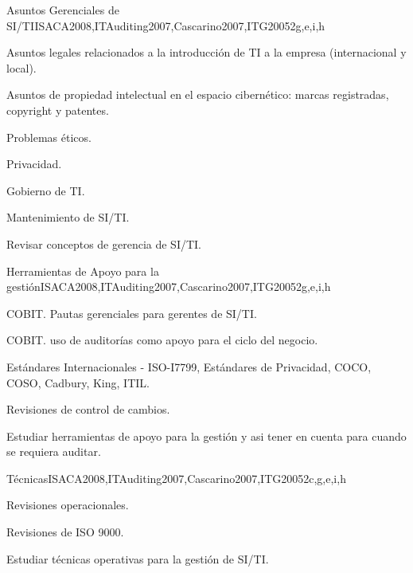 \begin{syllabus}
	\begin{unit}{Asuntos Gerenciales de SI/TI}{}{ISACA2008,ITAuditing2007,Cascarino2007,ITG2005}{2}{g,e,i,h}
	\begin{topics}
	\item Asuntos legales relacionados a la introducción de TI a la empresa (internacional y local).
	\item Asuntos de propiedad intelectual en el espacio cibernético: marcas registradas, copyright y patentes.
	\item Problemas éticos.
	\item Privacidad.
	\item Gobierno de TI.
	\item Mantenimiento de SI/TI.
	\end{topics}
	
	\begin{learningoutcomes}
	\item Revisar conceptos de gerencia de SI/TI.
	\end{learningoutcomes}
	\end{unit}
	
	\begin{unit}{Herramientas de Apoyo para la gestión}{}{ISACA2008,ITAuditing2007,Cascarino2007,ITG2005}{2}{g,e,i,h}
	\begin{topics}
	\item COBIT. Pautas gerenciales para gerentes de SI/TI.
	\item COBIT. uso de auditorías como apoyo para el ciclo del negocio.
	\item Estándares Internacionales - ISO-I7799, Estándares de Privacidad, COCO, COSO, Cadbury, King, ITIL.
	\item Revisiones de control de cambios.
	\end{topics}
	
	\begin{learningoutcomes}
	\item Estudiar herramientas de apoyo para la gestión y asi tener en cuenta para cuando se requiera auditar.
	\end{learningoutcomes}
	\end{unit}
	
	\begin{unit}{Técnicas}{}{ISACA2008,ITAuditing2007,Cascarino2007,ITG2005}{2}{c,g,e,i,h}
	\begin{topics}
	\item Revisiones operacionales.
	\item Revisiones de ISO 9000.
	\end{topics}
	\begin{learningoutcomes}
	\item Estudiar técnicas operativas para la gestión de SI/TI.
	\end{learningoutcomes}
	\end{unit}
	

\end{syllabus}
